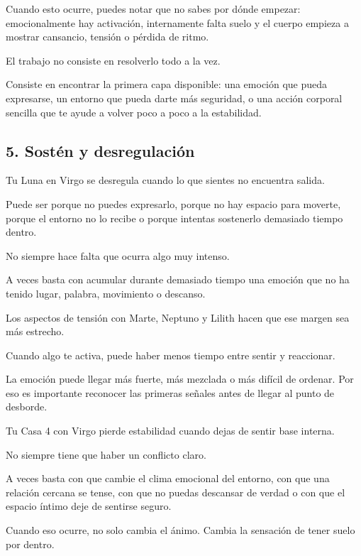 \documentclass[11pt,a4paper]{article}
\begin{document}
Cuando esto ocurre, puedes notar que no sabes por dónde empezar: emocionalmente hay activación, internamente falta suelo y el cuerpo empieza a mostrar cansancio, tensión o pérdida de ritmo.

El trabajo no consiste en resolverlo todo a la vez.

Consiste en encontrar la primera capa disponible: una emoción que pueda expresarse, un entorno que pueda darte más seguridad, o una acción corporal sencilla que te ayude a volver poco a poco a la estabilidad.

\vspace{0.8cm}

\subsection{5. Sostén y desregulación}

Tu Luna en Virgo se desregula cuando lo que sientes no encuentra salida.

Puede ser porque no puedes expresarlo, porque no hay espacio para moverte, porque el entorno no lo recibe o porque intentas sostenerlo demasiado tiempo dentro.

No siempre hace falta que ocurra algo muy intenso.

A veces basta con acumular durante demasiado tiempo una emoción que no ha tenido lugar, palabra, movimiento o descanso.

Los aspectos de tensión con Marte, Neptuno y Lilith hacen que ese margen sea más estrecho.

Cuando algo te activa, puede haber menos tiempo entre sentir y reaccionar.

La emoción puede llegar más fuerte, más mezclada o más difícil de ordenar. Por eso es importante reconocer las primeras señales antes de llegar al punto de desborde.

Tu Casa 4 con Virgo pierde estabilidad cuando dejas de sentir base interna.

No siempre tiene que haber un conflicto claro.

A veces basta con que cambie el clima emocional del entorno, con que una relación cercana se tense, con que no puedas descansar de verdad o con que el espacio íntimo deje de sentirse seguro.

Cuando eso ocurre, no solo cambia el ánimo. Cambia la sensación de tener suelo por dentro.
\end{document}
